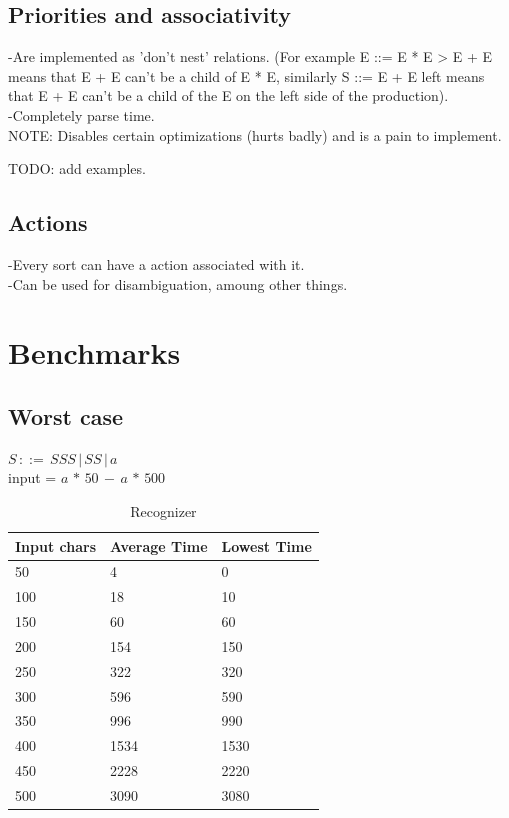 \documentclass[a4paper,10pt]{article}
\begin{document}
\subsection{Priorities and associativity}

-Are implemented as 'don't nest' relations. (For example E ::= E * E > E + E means that E + E can't be a child of E * E, similarly S ::= E + E {left} means that E + E can't be a child of the E on the left side of the production).\\
-Completely parse time.\\
NOTE: Disables certain optimizations (hurts badly) and is a pain to implement.

TODO: add examples.

\subsection{Actions}

-Every sort can have a action associated with it.\\
-Can be used for disambiguation, amoung other things.

\section{Benchmarks}

\subsection{Worst case}

$S\,::=\,SSS\,|\,SS\,|\,a$\\
input = $a\,*\,50\,-\,a\,*\,500$

\begin{table}[H]
\centering
\begin{tabular}{ | p{5em} | p{7em} | p{6em} | }
  \hline
  Input chars & Average Time & Lowest Time \\
  \hline
  50 & 4 & 0 \\
  100 & 18 & 10 \\
  150 & 60 & 60 \\
  200 & 154 & 150 \\
  250 & 322 & 320 \\
  300 & 596 & 590 \\
  350 & 996 & 990 \\
  400 & 1534 & 1530 \\
  450 & 2228 & 2220 \\
  500 & 3090 & 3080 \\
  \hline
\end{tabular}
\caption{Recognizer}
\end{table}
\end{document}
